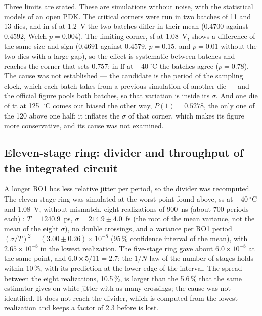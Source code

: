 Three limits are stated. These are simulations without noise, with the
statistical models of an open \ac{PDK}. The critical corners were run in
two batches of 11 and 13 dies, and in sf at 1.2~V the two batches differ
in their mean ($0.4700$ against $0.4592$, Welch $p = 0.004$). The
limiting corner, sf at 1.08~V, shows a difference of the same size and
sign ($0.4691$ against $0.4579$, $p = 0.15$, and $p = 0.01$ without the
two dies with a large gap), so the effect is systematic between batches
and reaches the corner that sets 0.757; in ff at $-40~^\circ$C the
batches agree ($p = 0.78$). The cause
was not established --- the candidate is the period of the sampling
clock, which each batch takes from a previous simulation of another die
--- and the official figure pools both batches, so that variation is
inside its $\sigma$. And one die of tt at 125~$^\circ$C comes out biased
the other way, $P(1) = 0.5278$, the only one of the 120 above one half;
it inflates the $\sigma$ of that corner, which makes its figure more
conservative, and its cause was not examined.

\subsection{Eleven-stage ring: divider and throughput of the integrated
circuit}
\label{sec:ihp_ring11}

A longer RO1 has less relative jitter per period, so the divider was
recomputed. The eleven-stage ring was simulated at the worst point found
above, ss at $-40~^\circ$C and 1.08~V, without mismatch, eight
realizations of 900~ns (about 700 periods each) \simu{}: $T = 1240.9$~ps,
$\sigma = 214.9 \pm 4.0$~fs (the root of the mean variance, not the mean
of the eight $\sigma$), no double crossings, and a variance per RO1
period $(\sigma/T)^2 = (3.00 \pm 0.26)\times10^{-8}$ (95\,\% confidence
interval of the mean), with $2.65\times10^{-8}$ in the lowest realization. The
five-stage ring gave about $6.0\times10^{-8}$ at the same point, and
$6.0 \times 5/11 = 2.7$: the $1/N$ law of the number of stages holds
within 10\,\%, with its prediction at the lower edge of the interval. The
spread between the eight realizations, 10.5\,\%, is larger than the
5.6\,\% that the same estimator gives on white jitter with as many
crossings; the cause was not identified. It does not reach the divider,
which is computed from the lowest realization and keeps a factor of 2.3
before  is lost.

